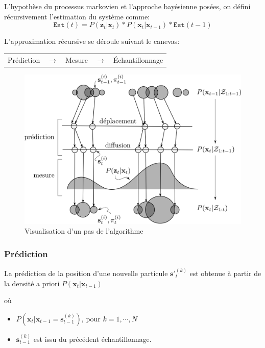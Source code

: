 \documentclass[a4paper,12pt]{report}
\begin{document}
L'hypothèse du processus markovien et l'approche bayésienne posées, on défini récursivement l'estimation du système comme:
$$\mathtt{Est}(t) = P(\mathbf{z}_{t}|\mathbf{x}_{t})*P(\mathbf{x}_{t}|\mathbf{x}_{t-1})*\mathtt{Est}(t-1)$$

L'approximation récursive se déroule suivant le canevas:
\begin{center}
\begin{tabular}{ c c c c c } 
\cellcolor[gray]{0.9} Prédiction & $\rightarrow$ & \cellcolor[gray]{0.9} Mesure & $\rightarrow$ & \cellcolor[gray]{0.9} Échantillonnage \\  
\end{tabular} 
\end{center}

\begin{figure}[hbtp]
\centering
\includegraphics[scale=0.45]{figureCondensationAlgo.png}
\caption{Visualisation d'un pas de l'algorithme}
\end{figure}


\subsubsection{Prédiction}
La prédiction de la position d'une nouvelle particule $\mathbf{s'}_{t}^{(k)}$ est obtenue à partir de la densité a priori $P(\mathbf{x}_{t}|\mathbf{x}_{t-1})$ 

où 
\begin{itemize}
\item[] $P(\mathbf{x}_{t}|\mathbf{x}_{t-1} = \mathbf{s}_{t-1}^{(k)})$, pour $k = 1,\cdots,N$ 
\item[] $\mathbf{s}_{t-1}^{(k)}$ est issu du précédent échantillonnage.
\end{itemize}
\end{document}
